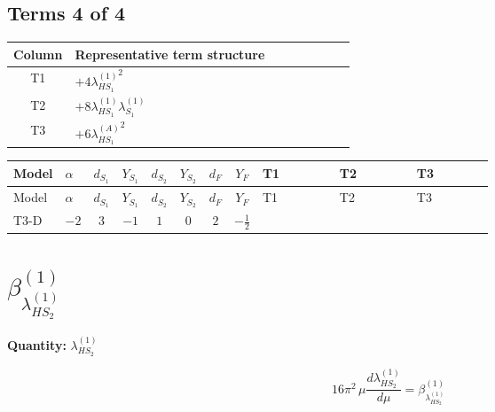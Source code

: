 \documentclass[8pt]{article}
\begin{document}
\begin{landscape}
\subsection*{Terms 4 of 4}
\begin{center}
\begin{tabular}{@{}c >{\raggedright\arraybackslash}p{0.82\linewidth}@{}}
\toprule
Column & Representative term structure \\
\midrule
T1 & \(\displaystyle +4 {\lambda_{HS_1}^{(1)}}^2\) \\
\midrule
T2 & \(\displaystyle +8 {\lambda_{HS_1}^{(1)}} {\lambda_{S_1}^{(1)}}\) \\
\midrule
T3 & \(\displaystyle +6 {\lambda_{HS_1}^{(A)}}^2\) \\
\midrule
\bottomrule
\end{tabular}
\end{center}
\smallskip
\tiny
\begin{longtable}{@{}llcccccc >{\raggedright\arraybackslash}p{0.21\linewidth} >{\raggedright\arraybackslash}p{0.21\linewidth} >{\raggedright\arraybackslash}p{0.21\linewidth}@{}}
\toprule
Model & $\alpha$ & $d_{S_1}$ & $Y_{S_1}$ & $d_{S_2}$ & $Y_{S_2}$ & $d_F$ & $Y_F$ & T1 & T2 & T3 \\
\midrule
\endfirsthead
\toprule
Model & $\alpha$ & $d_{S_1}$ & $Y_{S_1}$ & $d_{S_2}$ & $Y_{S_2}$ & $d_F$ & $Y_F$ & T1 & T2 & T3 \\
\midrule
\endhead
T3-D & $-2$ & $3$ & $-1$ & $1$ & $0$ & $2$ & $-\frac{1}{2}$ & \scriptsize\adjustbox{max width=\linewidth}{$\begin{gathered} +4 {\lambda_{HS_1}^{(1)}}^2\end{gathered}$} & \scriptsize\adjustbox{max width=\linewidth}{$\begin{gathered} +8 {\lambda_{HS_1}^{(1)}} {\lambda_{S_1}^{(1)}}\end{gathered}$} & \scriptsize\adjustbox{max width=\linewidth}{$\begin{gathered} +6 {\lambda_{HS_1}^{(A)}}^2\end{gathered}$} \\
\midrule
\bottomrule
\end{longtable}
\clearpage
\section*{$\beta_{\lambda_{HS_2}^{(1)}}^{(1)}$}
\noindent\textbf{Quantity: }$\lambda_{HS_2}^{(1)}$\par\smallskip
\[16\pi^2\,\mu\frac{d \lambda_{HS_2}^{(1)}}{d\mu}=\beta_{\lambda_{HS_2}^{(1)}}^{(1)}\]

\end{landscape}
\end{document}
